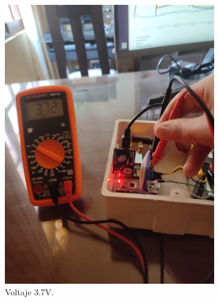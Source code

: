 \begin{figure}[h!]
  \centering
  \begin{subfigure}[b]{0.28\linewidth}
  \includegraphics[width=\linewidth]{./Figures/voltaje3v.jpg}
  \caption{Voltaje 3.7V.}
  \label{fig:Medicion de voltaje 3.7v}
  \end{subfigure}
  \begin{subfigure}[b]{0.28\linewidth}

\end{subfigure}
\end{figure}
